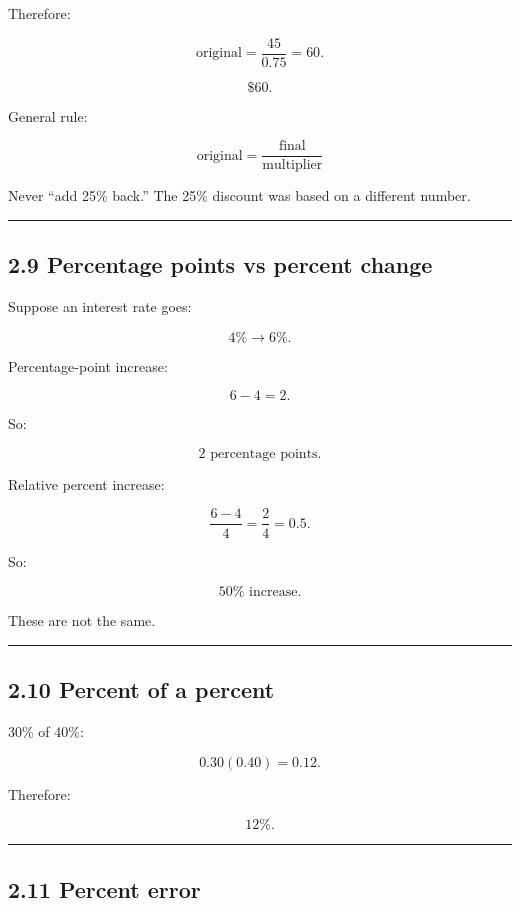 \documentclass[
]{article}
\begin{document}
Therefore:

\[
\text{original}=\frac{45}{0.75}=60.
\]

\[
\boxed{\$60}.
\]

General rule:

\[
\boxed{
\text{original}
=
\frac{\text{final}}
{\text{multiplier}}
}
\]

Never ``add 25\% back.'' The 25\% discount was based on a different
number.

\begin{center}\rule{0.5\linewidth}{0.5pt}\end{center}

\subsection{2.9 Percentage points vs percent
change}\label{percentage-points-vs-percent-change}

Suppose an interest rate goes:

\[
4\%\rightarrow6\%.
\]

Percentage-point increase:

\[
6-4=2.
\]

So:

\[
\boxed{2\text{ percentage points}}.
\]

Relative percent increase:

\[
\frac{6-4}{4}=\frac24=0.5.
\]

So:

\[
\boxed{50\%\text{ increase}}.
\]

These are not the same.

\begin{center}\rule{0.5\linewidth}{0.5pt}\end{center}

\subsection{2.10 Percent of a percent}\label{percent-of-a-percent}

30\% of 40\%:

\[
0.30(0.40)=0.12.
\]

Therefore:

\[
\boxed{12\%}.
\]

\begin{center}\rule{0.5\linewidth}{0.5pt}\end{center}

\subsection{2.11 Percent error}\label{percent-error}
\end{document}
